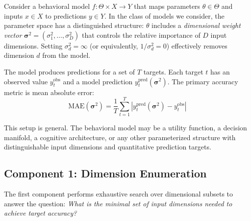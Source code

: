 \documentclass[12pt]{article}
\newcommand{\MAE}{\mathrm{MAE}}
\begin{document}
Consider a behavioral model $f: \Theta \times X \to Y$ that maps parameters $\theta \in \Theta$ and inputs $x \in X$ to predictions $y \in Y$.  In the class of models we consider, the parameter space has a distinguished structure: $\theta$ includes a \emph{dimensional weight vector} $\boldsymbol{\sigma}^2 = (\sigma_1^2, \ldots, \sigma_D^2)$ that controls the relative importance of $D$ input dimensions.  Setting $\sigma_d^2 = \infty$ (or equivalently, $1/\sigma_d^2 = 0$) effectively removes dimension $d$ from the model.

The model produces predictions for a set of $T$ targets.  Each target $t$ has an observed value $y_t^{\mathrm{obs}}$ and a model prediction $y_t^{\mathrm{pred}}(\boldsymbol{\sigma}^2)$.  The primary accuracy metric is mean absolute error:
\begin{equation}
    \MAE(\boldsymbol{\sigma}^2) = \frac{1}{T} \sum_{t=1}^{T} |y_t^{\mathrm{pred}}(\boldsymbol{\sigma}^2) - y_t^{\mathrm{obs}}|
    \label{eq:mae}
\end{equation}

This setup is general.  The behavioral model may be a utility function, a decision manifold, a cognitive architecture, or any other parameterized structure with distinguishable input dimensions and quantitative prediction targets.

\subsection{Component 1: Dimension Enumeration}

The first component performs exhaustive search over dimensional subsets to answer the question: \emph{What is the minimal set of input dimensions needed to achieve target accuracy?}
\end{document}
